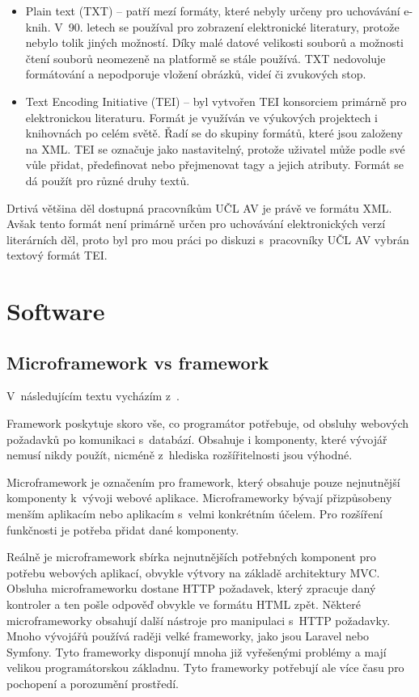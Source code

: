 \begin{itemize}
                \item Plain text (TXT) – patří mezí formáty, které nebyly určeny pro uchovávání e-knih. V~90. letech se používal pro zobrazení elektronické literatury, protože nebylo tolik jiných možností. Díky malé datové velikosti souborů a možnosti čtení souborů neomezeně na platformě se stále používá. TXT nedovoluje formátování a nepodporuje vložení obrázků, videí či zvukových stop.
                
                \item Text Encoding Initiative (TEI) – byl vytvořen TEI konsorciem primárně pro elektronickou literaturu. Formát je využíván ve výukových projektech i knihovnách po celém světě. Řadí se do skupiny formátů, které jsou založeny na XML. TEI se označuje jako nastavitelný, protože uživatel může podle své vůle přidat, předefinovat nebo přejmenovat tagy a jejich atributy. Formát se dá použít pro různé druhy textů.
            \end{itemize}
            
            Drtivá většina děl dostupná pracovníkům UČL AV je právě ve formátu XML. Avšak tento formát není primárně určen pro uchovávání elektronických verzí literárních děl, proto byl pro mou práci po diskuzi s~pracovníky UČL AV vybrán textový formát TEI.
    \section{Software}
        \subsection{Microframework vs framework}
            V~následujícím textu vycházím z~\cite{microframework-vs-framework}.
            
            Framework poskytuje skoro vše, co programátor potřebuje, od obsluhy webových požadavků po komunikaci s~databází. Obsahuje i komponenty, které vývojář nemusí nikdy použít, nicméně z~hlediska rozšířitelnosti jsou výhodné.
            
            Microframework je označením pro framework, který obsahuje pouze nejnutnější komponenty k~vývoji webové aplikace. Microframeworky bývají přizpůsobeny menším aplikacím nebo aplikacím s~velmi konkrétním účelem. Pro rozšíření funkčnosti je potřeba přidat dané komponenty.
            
            Reálně je microframework sbírka nejnutnějších potřebných komponent pro potřebu webových aplikací, obvykle výtvory na základě architektury MVC. Obsluha microframeworku dostane HTTP požadavek, který zpracuje daný kontroler a ten pošle odpověď obvykle ve formátu HTML zpět. Některé microframeworky obsahují další nástroje pro manipulaci s~HTTP požadavky. Mnoho vývojářů používá raději velké frameworky, jako jsou Laravel nebo Symfony. Tyto frameworky disponují mnoha již vyřešenými problémy a mají velikou programátorskou základnu. Tyto frameworky potřebují ale více času pro pochopení a porozumění prostředí. 
            
